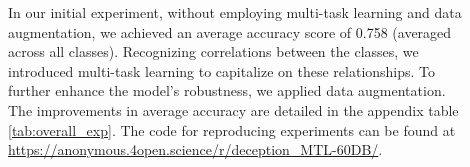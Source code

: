 \begin{enumerate}
\vspace{-3mm}
\begin{description}
\item[] In our initial experiment, without employing multi-task learning and data augmentation, we achieved an average accuracy score of 0.758 (averaged across all classes). Recognizing correlations between the classes, we introduced multi-task learning to capitalize on these relationships. To further enhance the model's robustness, we applied data augmentation. The improvements in average accuracy are detailed in the appendix table \ref{tab:overall_exp}. The code for reproducing experiments can be found at  \url{https://anonymous.4open.science/r/deception_MTL-60DB/}.
\end{description}


    

\end{enumerate}
